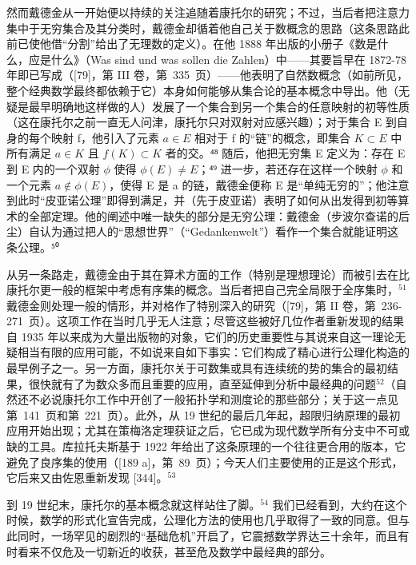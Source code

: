 然而戴德金从一开始便以持续的关注追随着康托尔的研究；不过，当后者把注意力集中于无穷集合及其分类时，戴德金却循着他自己关于数概念的思路（这条思路此前已使他借“分割”给出了无理数的定义）。在他 1888 年出版的小册子《数是什么，应是什么》（Was sind und was sollen die Zahlen）中——其要旨早在 1872-78 年即已写成（{[}79{]}，第 III 卷，第~335~页）——他表明了自然数概念（如前所见，整个经典数学最终都依赖于它）本身如何能够从集合论的基本概念中导出。他（无疑是最早明确地这样做的人）发展了一个集合到另一个集合的任意映射的初等性质（这在康托尔之前一直无人问津，康托尔只对双射对应感兴趣）；对于集合 E 到自身的每个映射 f，他引入了元素 \(a \in E\) 相对于 f 的“链”的概念，即集合 \(K \subset E\) 中所有满足 \(a \in K\) 且 \(f(K) \subset K\) 者的交。⁴⁸ 随后，他把无穷集 E 定义为：存在 E 到 E 内的一个双射 \(\phi\) 使得 \(\phi(E) \neq E\)；⁴⁹ 进一步，若还存在这样一个映射 \(\phi\) 和一个元素 \(a \notin \phi(E)\)，使得 E 是 a 的链，戴德金便称 E 是“单纯无穷的”；他注意到此时“皮亚诺公理”即得到满足，并（先于皮亚诺）表明了如何从出发得到初等算术的全部定理。他的阐述中唯一缺失的部分是无穷公理：戴德金（步波尔查诺的后尘）自认为通过把人的“思想世界”（“Gedankenwelt”）看作一个集合就能证明这条公理。⁵⁰

从另一条路走，戴德金由于其在算术方面的工作（特别是理想理论）而被引去在比康托尔更一般的框架中考虑有序集的概念。当后者把自己完全局限于全序集时，\(^{51}\) 戴德金则处理一般的情形，并对格作了特别深入的研究（{[}79{]}，第 II 卷，第~236-271~页）。这项工作在当时几乎无人注意；尽管这些被好几位作者重新发现的结果自 1935 年以来成为大量出版物的对象，它们的历史重要性与其说来自这一理论无疑相当有限的应用可能，不如说来自如下事实：它们构成了精心进行公理化构造的最早例子之一。另一方面，康托尔关于可数集或具有连续统的势的集合的最初结果，很快就有了为数众多而且重要的应用，直至延伸到分析中最经典的问题\(^{52}\)（自然还不必说康托尔工作中开创了一般拓扑学和测度论的那些部分；关于这一点见第~141~页和第~221~页）。此外，从 19 世纪的最后几年起，超限归纳原理的最初应用开始出现；尤其在策梅洛定理获证之后，它已成为现代数学所有分支中不可或缺的工具。库拉托夫斯基于 1922 年给出了这条原理的一个往往更合用的版本，它避免了良序集的使用（{[}189 a{]}，第~89~页）；今天人们主要使用的正是这个形式，它后来又由佐恩重新发现 {[}344{]}。\(^{53}\)

到 19 世纪末，康托尔的基本概念就这样站住了脚。\(^{54}\) 我们已经看到，大约在这个时候，数学的形式化宣告完成，公理化方法的使用也几乎取得了一致的同意。但与此同时，一场罕见的剧烈的“基础危机”开启了，它震撼数学界达三十余年，而且有时看来不仅危及一切新近的收获，甚至危及数学中最经典的部分。

